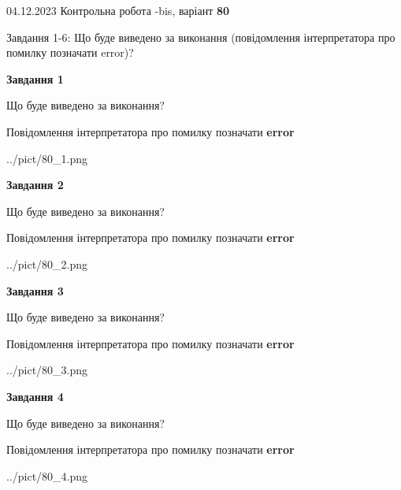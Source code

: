 \documentclass[12pt, ukrainian]{article}
\begin{document}
{{04.12.2023 Контрольна робота -bis, варіант  \No \textbf { 80 }\par}}
{

Завдання 1-6: Що буде виведено за виконання (повідомлення інтерпретатора про помилку позначати error)?


{\begin {center}\textbf{Завдання 1}\end {center}}\par
Що буде виведено за виконання? \par
Повідомлення інтерпретатора про помилку позначати \textbf{error}

\begin{center}
	{../pict/80_1.png}
\end{center}
\newpage

{\begin {center}\textbf{Завдання 2}\end {center}}\par
Що буде виведено за виконання? \par
Повідомлення інтерпретатора про помилку позначати \textbf{error}

\begin{center}
	{../pict/80_2.png}
\end{center}
\newpage

{\begin {center}\textbf{Завдання 3}\end {center}}\par
Що буде виведено за виконання? \par
Повідомлення інтерпретатора про помилку позначати \textbf{error}

\begin{center}
	{../pict/80_3.png}
\end{center}
\newpage

{\begin {center}\textbf{Завдання 4}\end {center}}\par
Що буде виведено за виконання? \par
Повідомлення інтерпретатора про помилку позначати \textbf{error}

\begin{center}
	{../pict/80_4.png}
\end{center}
\newpage

}
\end{document}
